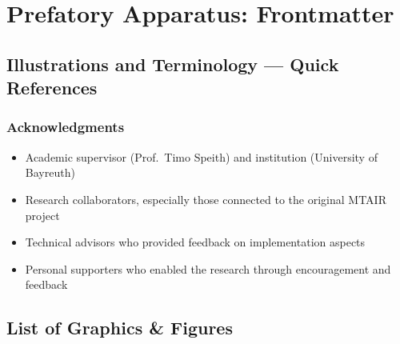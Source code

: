 \documentclass[
  11pt,
  letterpaper,
]{book}
\providecommand{\tightlist}{%
  \setlength{\itemsep}{0pt}\setlength{\parskip}{0pt}}
\begin{document}

\chapter*{Prefatory Apparatus:
Frontmatter}\label{prefatory-apparatus-frontmatter}


\section*{Illustrations and Terminology --- Quick
References}\label{illustrations-and-terminology-quick-references}


\subsection*{\texorpdfstring{\textbf{Acknowledgments}}{Acknowledgments}}\label{acknowledgments}

\begin{itemize}
\tightlist
\item
  Academic supervisor (Prof.~Timo Speith) and institution (University of
  Bayreuth)\\
\item
  Research collaborators, especially those connected to the original
  MTAIR project\\
\item
  Technical advisors who provided feedback on implementation aspects\\
\item
  Personal supporters who enabled the research through encouragement and
  feedback
\end{itemize}

\section*{List of Graphics \& Figures}\label{list-of-graphics-figures}

\end{document}
